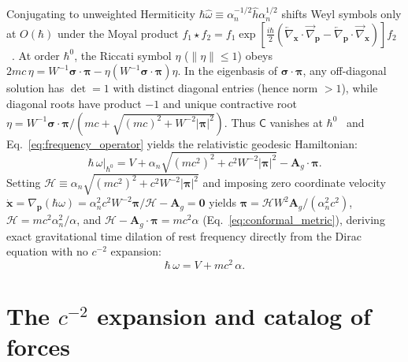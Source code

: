 \documentclass[aps,prd,onecolumn,tightenlines,nofootinbib,notitlepage,10pt,floatfix]{revtex4-2}
\theoremstyle{indentedtheorem}
\begin{document}
Conjugating to unweighted Hermiticity $\hbar\hat{\omega}\equiv\alpha_n^{-1/2}\hat{h}\alpha_n^{1/2}$ shifts Weyl symbols only at $O(\hbar)$ under the Moyal product $f_1\star f_2=f_1\exp[\frac{i\hbar}{2}(\overleftarrow{\nabla}_{\mathbf{x}}\cdot\overrightarrow{\nabla}_{\mathbf{p}}-\overleftarrow{\nabla}_{\mathbf{p}}\cdot\overrightarrow{\nabla}_{\mathbf{x}})]f_2$~\citep{CurtrightZachos2012Quantum}. At order $\hbar^0$, the Riccati symbol $\eta$ ($\|\eta\|\le 1$) obeys $2mc\,\eta=W^{-1}\boldsymbol{\sigma}\cdot\boldsymbol{\pi}-\eta(W^{-1}\boldsymbol{\sigma}\cdot\boldsymbol{\pi})\eta$. In the eigenbasis of $\boldsymbol{\sigma}\cdot\boldsymbol{\pi}$, any off-diagonal solution has $\det=1$ with distinct diagonal entries (hence norm $>1$), while diagonal roots have product $-1$ and unique contractive root $\eta=W^{-1}\boldsymbol{\sigma}\cdot\boldsymbol{\pi}/(mc+\sqrt{(mc)^2+W^{-2}|\boldsymbol{\pi}|^2})$. Thus $\mathsf{C}$ vanishes at $\hbar^0$~\citep{PanatiSpohnTeufel2003Space} and Eq.~\eqref{eq:frequency_operator} yields the relativistic geodesic Hamiltonian:
\begin{equation}
    \hbar\,\omega\big|_{\hbar^0} = V + \alpha_n\sqrt{(mc^2)^2 + c^2 W^{-2}|\boldsymbol{\pi}|^2} - \mathbf{A}_g\cdot\boldsymbol{\pi} .
    \label{eq:classical_master_symbol}
\end{equation}
Setting $\mathcal{H}\equiv\alpha_n\sqrt{(mc^2)^2+c^2 W^{-2}|\boldsymbol{\pi}|^2}$ and imposing zero coordinate velocity $\dot{\mathbf{x}}=\nabla_{\mathbf{p}}(\hbar\omega)=\alpha_n^2 c^2 W^{-2}\boldsymbol{\pi}/\mathcal{H}-\mathbf{A}_g=\mathbf{0}$ yields $\boldsymbol{\pi}=\mathcal{H}W^2\mathbf{A}_g/(\alpha_n^2 c^2)$, $\mathcal{H}=mc^2\alpha_n^2/\alpha$, and $\mathcal{H}-\mathbf{A}_g\cdot\boldsymbol{\pi}=mc^2\alpha$ (Eq.~\eqref{eq:conformal_metric}), deriving exact gravitational time dilation of rest frequency directly from the Dirac equation with no $c^{-2}$ expansion:
\begin{equation}
    \hbar\,\omega = V + mc^2\,\alpha .
    \label{eq:static_master}
\end{equation}

\section{The \texorpdfstring{$c^{-2}$}{1/c\texttwosuperior} expansion and catalog of forces}
\label{sec:expansion_orders}
\end{document}
